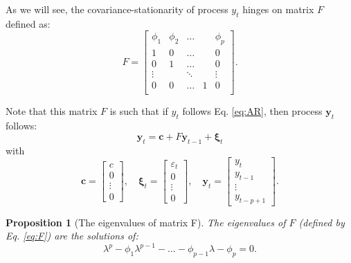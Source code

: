 \documentclass[
  12pt,
]{book}
\newtheorem{proposition}{Proposition}[chapter]
\theoremstyle{definition}
\theoremstyle{definition}
\theoremstyle{definition}
\theoremstyle{definition}
\theoremstyle{remark}
\begin{document}
As we will see, the covariance-stationarity of process \(y_t\) hinges on matrix \(F\) defined as:
\begin{equation}
F = \left[
\begin{array}{ccccc}
\phi_1 & \phi_2 & \dots& & \phi_p \\
1 & 0 &\dots && 0 \\
0 & 1 &\dots && 0 \\
\vdots &  & \ddots && \vdots \\
0 & 0 &\dots &1& 0 \\
\end{array}
\right].\label{eq:F}
\end{equation}

Note that this matrix \(F\) is such that if \(y_t\) follows Eq. \eqref{eq:AR}, then process \(\mathbf{y}_t\) follows:
\[
\mathbf{y}_t = \mathbf{c} + F \mathbf{y}_{t-1} + \boldsymbol\xi_t
\]
with
\[
\mathbf{c} =
\left[\begin{array}{c}
c\\
0\\
\vdots\\
0
\end{array}\right],
\quad
\boldsymbol\xi_t =
\left[\begin{array}{c}
\varepsilon_t\\
0\\
\vdots\\
0
\end{array}\right],
\quad
\mathbf{y}_t =
\left[\begin{array}{c}
y_t\\
y_{t-1}\\
\vdots\\
y_{t-p+1}
\end{array}\right].
\]

\begin{proposition}[The eigenvalues of matrix F]
\protect\hypertarget{prp:Feigen}{}\label{prp:Feigen}The eigenvalues of \(F\) (defined by Eq. \eqref{eq:F}) are the solutions of:
\begin{equation}
\lambda^p - \phi_1 \lambda^{p-1} - \dots - \phi_{p-1}\lambda - \phi_p = 0.\label{eq:Feigen}
\end{equation}
\end{proposition}
\end{document}
